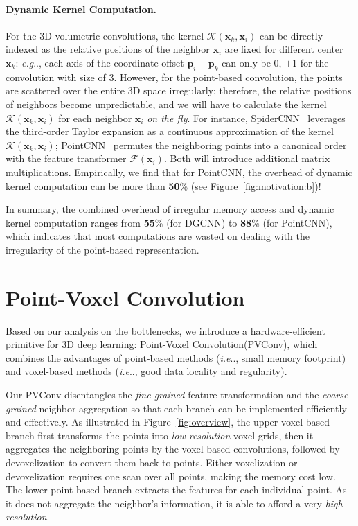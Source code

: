 \documentclass{article}
\makeatletter
\newcommand{\fig}[1]{Figure~\ref{#1}}
\DeclareRobustCommand\onedot{\futurelet\@let@token\@onedot}
\def\@onedot{\ifx\@let@token.\else.\null\fi\xspace}
\def\eg{\emph{e.g}\onedot} \def\Eg{\emph{E.g}\onedot}
\def\ie{\emph{i.e}\onedot} \def\Ie{\emph{I.e}\onedot}
\newcommand{\myparagraph}[1]{\vspace{-6pt}\paragraph{#1}}
\def\conv{Point-Voxel Convolution\xspace}
\def\convshort{PVConv\xspace}
\makeatother
\begin{document}
\myparagraph{Dynamic Kernel Computation.}

For the 3D volumetric convolutions, the kernel $\mathcal{K}(\bm{x}_k, \bm{x}_i)$ can be directly indexed as the relative positions of the neighbor $\bm{x}_i$ are fixed for different center $\bm{x}_k$: \eg, each axis of the coordinate offset $\bm{p}_i - \bm{p}_k$ can only be 0, $\pm$1 for the convolution with size of 3. However, for the point-based convolution, the points are scattered over the entire 3D space irregularly; therefore, the relative positions of neighbors become unpredictable, and we will have to calculate the kernel $\mathcal{K}(\bm{x}_k, \bm{x}_i)$ for each neighbor $\bm{x}_i$ \textit{on the fly}. For instance, SpiderCNN~\cite{Xu:2018sp} leverages the third-order Taylor expansion as a continuous approximation of the kernel $\mathcal{K}(\bm{x}_k, \bm{x}_i)$; PointCNN~\cite{Li:2018tp} permutes the neighboring points into a canonical order with the feature transformer $\mathcal{F}(\bm{x}_i)$. Both will introduce additional matrix multiplications. Empirically, we find that for PointCNN, the overhead of dynamic kernel computation can be more than \textbf{50}\% (see \fig{fig:motivation:b})!

In summary, the combined overhead of irregular memory access and dynamic kernel computation ranges from \textbf{55}\% (for DGCNN) to \textbf{88}\% (for PointCNN), which indicates that most computations are wasted on dealing with the irregularity of the point-based representation.
 \section{Point-Voxel Convolution}

Based on our analysis on the bottlenecks, we introduce a hardware-efficient primitive for 3D deep learning: \conv (\convshort), which combines the advantages of point-based methods (\ie, small memory footprint) and voxel-based methods (\ie, good data locality and regularity).

Our \convshort disentangles the \emph{fine-grained} feature transformation and the \emph{coarse-grained} neighbor aggregation so that each branch can be implemented efficiently and effectively. As illustrated in \fig{fig:overview}, the upper voxel-based branch first transforms the points into \emph{low-resolution} voxel grids, then it aggregates the neighboring points by the voxel-based convolutions, followed by devoxelization to convert them back to points. Either voxelization or devoxelization requires one scan over all points, making the memory cost low. The lower point-based branch extracts the features for each individual point. As it does not aggregate the neighbor's information, it is able to afford a very \emph{high resolution}.
\end{document}
